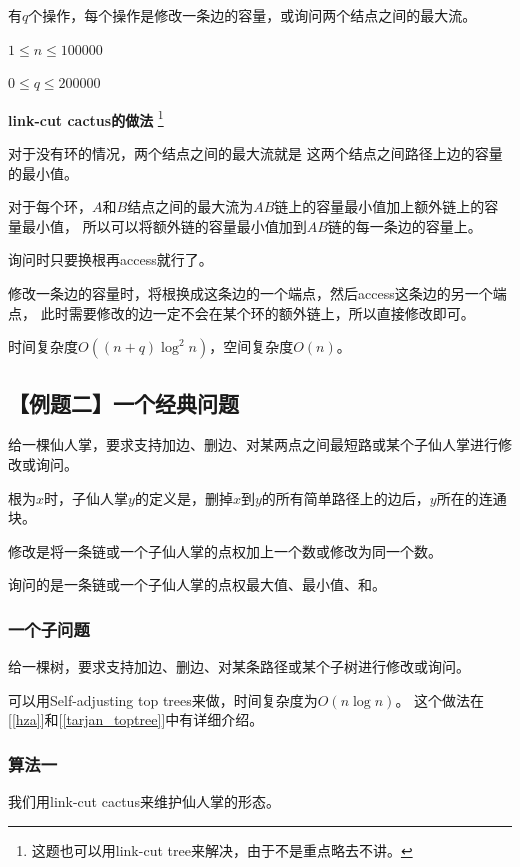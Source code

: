 \documentclass{noithesis}
\begin{document}
有$q$个操作，每个操作是修改一条边的容量，或询问两个结点之间的最大流。

$1 \le n \le 100000$

$0 \le q \le 200000$

\text{}

\textbf{link-cut cactus的做法}
\footnote{这题也可以用link-cut tree来解决，由于不是重点略去不讲。}

对于没有环的情况，两个结点之间的最大流就是
这两个结点之间路径上边的容量的最小值。

对于每个环，$A$和$B$结点之间的最大流为$A B$链上的容量最小值加上额外链上的容量最小值，
所以可以将额外链的容量最小值加到$A B$链的每一条边的容量上。

询问时只要换根再access就行了。

修改一条边的容量时，将根换成这条边的一个端点，然后access这条边的另一个端点，
此时需要修改的边一定不会在某个环的额外链上，所以直接修改即可。

时间复杂度$O((n+q) \log ^ 2 n)$，空间复杂度$O(n)$。


\subsection{【例题二】一个经典问题}

给一棵仙人掌，要求支持加边、删边、对某两点之间最短路或某个子仙人掌进行修改或询问。

根为$x$时，子仙人掌$y$的定义是，删掉$x$到$y$的所有简单路径上的边后，$y$所在的连通块。

修改是将一条链或一个子仙人掌的点权加上一个数或修改为同一个数。

询问的是一条链或一个子仙人掌的点权最大值、最小值、和。

\text{}

\subsubsection{一个子问题}

给一棵树，要求支持加边、删边、对某条路径或某个子树进行修改或询问。

\text{}

可以用Self-adjusting top trees来做，时间复杂度为$O(n \log n)$。
这个做法在[\ref{hza}]和[\ref{tarjan_toptree}]中有详细介绍。

\subsubsection{算法一}

我们用link-cut cactus来维护仙人掌的形态。
\end{document}
